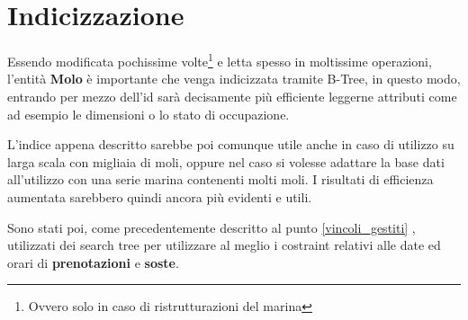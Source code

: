 \section{Indicizzazione}

Essendo modificata pochissime volte\footnote{Ovvero solo in caso di ristrutturazioni del marina} e letta spesso in moltissime operazioni, l'entità \textbf{Molo} è importante che venga indicizzata tramite B-Tree, in questo modo, entrando per mezzo dell'id sarà decisamente più efficiente leggerne attributi come ad esempio le dimensioni o lo stato di occupazione.

L'indice appena descritto sarebbe poi comunque utile anche in caso di utilizzo su larga scala con migliaia di moli, oppure nel caso si volesse adattare la base dati all'utilizzo con una serie marina contenenti molti moli. I risultati di efficienza aumentata sarebbero quindi ancora più evidenti e utili.

Sono stati poi, come precedentemente descritto al punto \ref{vincoli_gestiti} , utilizzati dei search tree per utilizzare al meglio i costraint relativi alle date ed orari di \textbf{prenotazioni} e \textbf{soste}.
